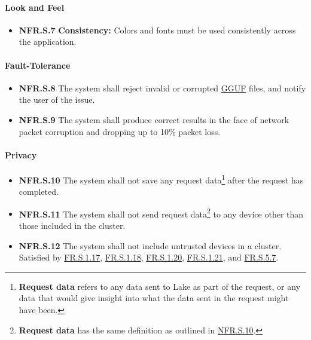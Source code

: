 \documentclass[12pt]{article}
\begin{document}
\paragraph{Look and Feel}
\begin{itemize}
	\item \label{NFR.S.7}\textbf{NFR.S.7} \textbf{Consistency:} Colors and fonts must be used consistently
		across the application.
\end{itemize}

\paragraph{Fault-Tolerance}
\begin{itemize}
	\item \label{NFR.S.8}\textbf{NFR.S.8} The system shall reject invalid or corrupted
		\href{https://github.com/ggml-org/ggml/blob/master/docs/gguf.md}{GGUF} files, and notify the user of the
		issue.
	\item \label{NFR.S.9}\textbf{NFR.S.9} The system shall produce correct results in the face of network packet
		corruption and dropping up to 10\% packet loss.
\end{itemize}

\paragraph{Privacy}
\begin{itemize}
	\item \label{NFR.S.10}\textbf{NFR.S.10} The system shall not save any request
		data\footnote{\textbf{Request data} refers to any data sent to Lake as part of the request, or any data
		that would give insight into what the data sent in the request might have been.}
		after the request has completed.
	\item \label{NFR.S.11}\textbf{NFR.S.11} The system shall not send request
		data\footnote{\textbf{Request data} has the same definition as outlined in \hyperref[NFR.S.10]{NFR.S.10}.}
		to any device other than those included in the cluster.
	\item \label{NFR.S.12}\textbf{NFR.S.12} The system shall not include untrusted devices in
		a cluster. Satisfied by \hyperref[FR.S.1.17]{FR.S.1.17}, \hyperref[FR.S.1.18]{FR.S.1.18},
		\hyperref[FR.S.1.20]{FR.S.1.20}, \hyperref[FR.S.1.21]{FR.S.1.21}, and \hyperref[FR.S.5.7]{FR.S.5.7}.
\end{itemize}
\end{document}
